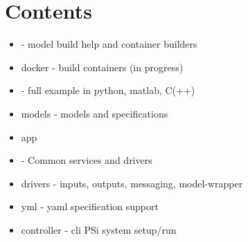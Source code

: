 \documentclass[letterpaper,10pt,english]{sphinxmanual}
\begin{document}
\section{Contents}
\label{\detokenize{includeme:contents}}\begin{itemize}
\item {} 
 - model build help and container builders

\item {} 
docker - build containers (in progress)

\item {} 
 - full example in python, matlab, C(++)

\item {} 
models - models and specifications

\item {} 
app

\item {} 
 - Common services and drivers

\item {} 
drivers - inputs, outputs, messaging, model-wrapper

\item {} 
yml - yaml specification support

\item {} 
controller - cli PSi system setup/run

\end{itemize}
\end{document}
